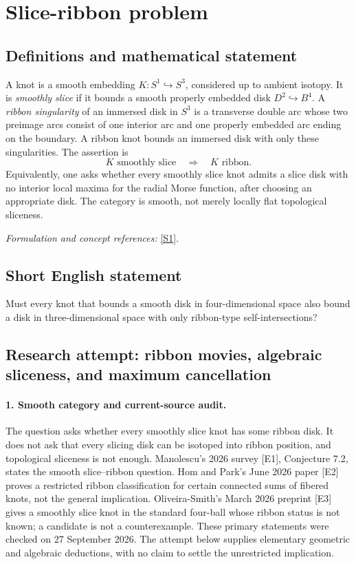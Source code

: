 \documentclass[11pt]{article}
\begin{document}
\section*{\texorpdfstring{Slice-ribbon problem}{Slice-ribbon problem}}\label{3412}
\subsection{Definitions and mathematical statement}
A knot is a smooth embedding $K:S^1\hookrightarrow S^3$, considered up to ambient isotopy. It is \emph{smoothly slice} if it bounds a smooth properly embedded disk $D^2\hookrightarrow B^4$. A \emph{ribbon singularity} of an immersed disk in $S^3$ is a transverse double arc whose two preimage arcs consist of one interior arc and one properly embedded arc ending on the boundary. A ribbon knot bounds an immersed disk with only these singularities. The assertion is
\[
 K\text{ smoothly slice}\quad\Longrightarrow\quad K\text{ ribbon}.
\]
Equivalently, one asks whether every smoothly slice knot admits a slice disk with no interior local maxima for the radial Morse function, after choosing an appropriate disk. The category is smooth, not merely locally flat topological sliceness.
\par\smallskip\textit{Formulation and concept references:} \href{https://www.openproblemgarden.org/op/slice_ribbon_problem_0}{[S1]}.

\subsection{Short English statement}
Must every knot that bounds a smooth disk in four-dimensional space also bound a disk in three-dimensional space with only ribbon-type self-intersections?
\subsection{Research attempt: ribbon movies, algebraic sliceness, and maximum cancellation}
\paragraph{1. Smooth category and current-source audit.}
The question asks whether every smoothly slice knot has some ribbon disk. It does not ask that every slicing disk can be isotoped into ribbon position, and topological sliceness is not enough. Manolescu's 2026 survey [E1], Conjecture 7.2, states the smooth slice--ribbon question. Hom and Park's June 2026 paper [E2] proves a restricted ribbon classification for certain connected sums of fibered knots, not the general implication. Oliveira-Smith's March 2026 preprint [E3] gives a smoothly slice knot in the standard four-ball whose ribbon status is not known; a candidate is not a counterexample. These primary statements were checked on 27 September 2026. The attempt below supplies elementary geometric and algebraic deductions, with no claim to settle the unrestricted implication.
\end{document}
